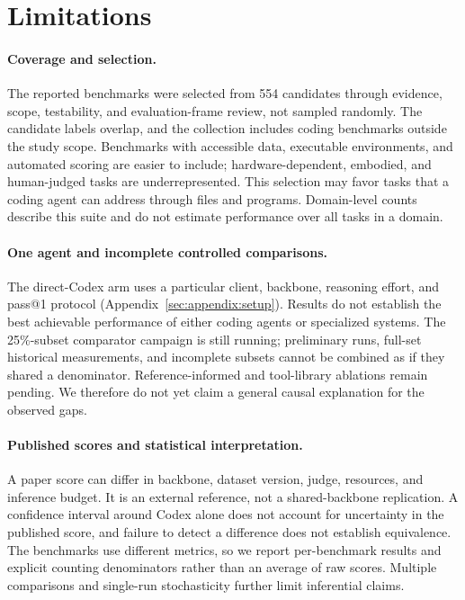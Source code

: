 \section{Limitations}
\label{sec:limitations}

\paragraph{Coverage and selection.}
The \StudyBenchmarkCount{} reported benchmarks were selected from 554 candidates through evidence,
scope, testability, and evaluation-frame review, not sampled randomly. The candidate labels overlap,
and the collection includes coding benchmarks outside the study scope. Benchmarks with accessible data,
executable environments, and automated scoring are easier to include; hardware-dependent,
embodied, and human-judged tasks are underrepresented. This selection may favor tasks that a
coding agent can address through files and programs. Domain-level counts describe this suite
and do not estimate performance over all tasks in a domain.

\paragraph{One agent and incomplete controlled comparisons.}
The direct-Codex arm uses a particular client, backbone, reasoning effort, and pass@1 protocol
(Appendix~\ref{sec:appendix:setup}). Results do not establish the best achievable performance
of either coding agents or specialized systems. The 25\%-subset comparator campaign is still
running; preliminary runs, full-set historical measurements, and incomplete subsets cannot be
combined as if they shared a denominator. Reference-informed and tool-library ablations remain
pending. We therefore do not yet claim a general causal explanation for the observed gaps.

\paragraph{Published scores and statistical interpretation.}
A paper score can differ in backbone, dataset version, judge, resources, and inference budget.
It is an external reference, not a shared-backbone replication. A confidence interval around
Codex alone does not account for uncertainty in the published score, and failure to detect a
difference does not establish equivalence. The benchmarks use different metrics, so we report
per-benchmark results and explicit counting denominators rather than an average of raw scores.
Multiple comparisons and single-run stochasticity further limit inferential claims.

